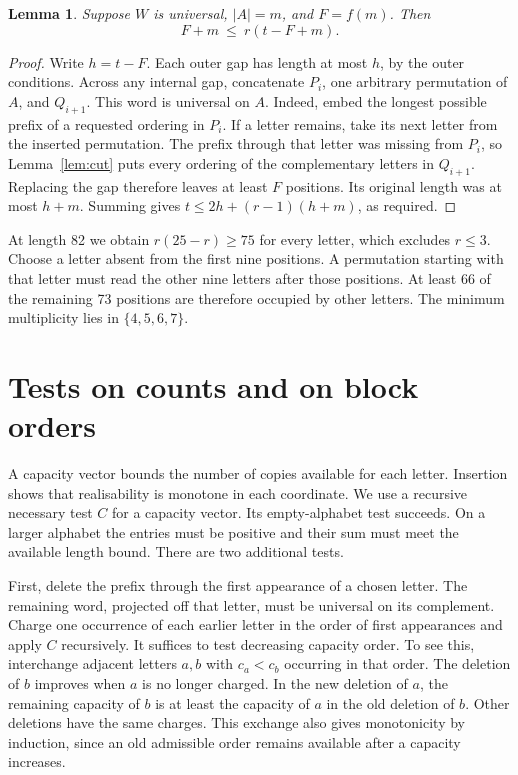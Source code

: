 \documentclass[11pt]{article}
\newtheorem{lemma}[theorem]{Lemma}
\begin{document}
\begin{lemma}\label{lem:gap}
Suppose $W$ is universal, $|A|=m$, and $F=f(m)$. Then
\[
                    F+m\ \le\ r(t-F+m).
\]
\end{lemma}
\begin{proof}
Write $h=t-F$. Each outer gap has length at most $h$, by the outer conditions. Across any internal gap, concatenate $P_i$, one arbitrary permutation of $A$, and $Q_{i+1}$. This word is universal on $A$. Indeed, embed the longest possible prefix of a requested ordering in $P_i$. If a letter remains, take its next letter from the inserted permutation. The prefix through that letter was missing from $P_i$, so Lemma~\ref{lem:cut} puts every ordering of the complementary letters in $Q_{i+1}$. Replacing the gap therefore leaves at least $F$ positions. Its original length was at most $h+m$. Summing gives $t\le 2h+(r-1)(h+m)$, as required.
\end{proof}
At length 82 we obtain $r(25-r)\ge75$ for every letter, which excludes $r\le3$. Choose a letter absent from the first nine positions. A permutation starting with that letter must read the other nine letters after those positions. At least 66 of the remaining 73 positions are therefore occupied by other letters. The minimum multiplicity lies in $\{4,5,6,7\}$.

\section{Tests on counts and on block orders}\label{sec:tests}
A capacity vector bounds the number of copies available for each letter. Insertion shows that realisability is monotone in each coordinate. We use a recursive necessary test $C$ for a capacity vector. Its empty-alphabet test succeeds. On a larger alphabet the entries must be positive and their sum must meet the available length bound. There are two additional tests.

First, delete the prefix through the first appearance of a chosen letter. The remaining word, projected off that letter, must be universal on its complement. Charge one occurrence of each earlier letter in the order of first appearances and apply $C$ recursively. It suffices to test decreasing capacity order. To see this, interchange adjacent letters $a,b$ with $c_a<c_b$ occurring in that order. The deletion of $b$ improves when $a$ is no longer charged. In the new deletion of $a$, the remaining capacity of $b$ is at least the capacity of $a$ in the old deletion of $b$. Other deletions have the same charges. This exchange also gives monotonicity by induction, since an old admissible order remains available after a capacity increases.
\end{document}
